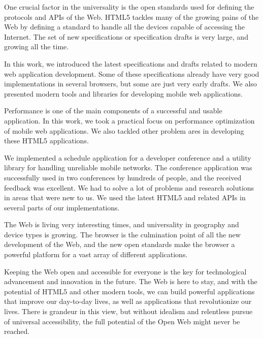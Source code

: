 One crucial factor in the universality is the open standards used for
defining the protocols and APIs of the Web. HTML5 tackles many of the
growing pains of the Web by defining a standard to handle all the
devices capable of accessing the Internet. The set of new
specifications or specification drafts is very large, and growing all
the time.

In this work, we introduced the latest specifications and drafts
related to modern web application development. Some of these
specifications already have very good implementations in several
browsers, but some are just very early drafts. We also presented
modern tools and libraries for developing mobile web applications.

Performance is one of the main components of a successful and usable
application. In this work, we took a practical focus on performance
optimization of mobile web applications. We also tackled other problem
ares in developing these HTML5 applications.

We implemented a schedule application for a developer conference and a
utility library for handling unreliable mobile networks. The
conference application was successfully used in two conferences by
hundreds of people, and the received feedback was excellent. We had to
solve a lot of problems and research solutions in areas that were new
to us. We used the latest HTML5 and related APIs in several parts of
our implementations.

The Web is living very interesting times, and universality in
geography and device types is growing. The browser is the culmination
point of all the new development of the Web, and the new open
standards make the browser a powerful platform for a vast array of
different applications.

Keeping the Web open and accessible for everyone is the key for
technological advancement and innovation in the future. The Web is
here to stay, and with the potential of HTML5 and other modern tools,
we can build powerful applications that improve our day-to-day lives,
as well as applications that revolutionize our lives. There is
grandeur in this view, but without idealism and relentless pursue of
universal accessibility, the full potential of the Open Web might
never be reached.
